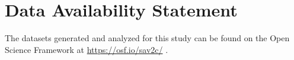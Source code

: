 
\section*{Data Availability Statement}

The datasets generated and analyzed for this study can be found on the Open Science Framework at \url{https://osf.io/sav2c/} \citep{osf_data}.
